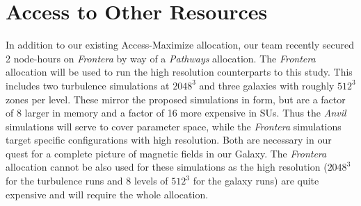 \section{Access to Other Resources}
\label{sec.others}

In addition to our existing Access-Maximize allocation, our team recently
secured 2 node-hours on \emph{Frontera} by way of a \emph{Pathways}
allocation.  The \emph{Frontera} allocation will be used to run the high resolution
counterparts to this study.  This includes two turbulence simulations at $2048^3$ and three
galaxies with roughly $512^3$ zones per level.  These mirror the proposed
simulations in form, but are a factor of 8 larger in memory and a factor of 16 more
expensive in SUs.    Thus the \emph{Anvil} simulations will serve to cover
parameter space, while the \emph{Frontera} simulations target specific
configurations with high resolution.  Both are necessary in our quest for a
complete picture of magnetic fields in our Galaxy.  The \emph{Frontera}
allocation cannot be also used for these simulations as the high resolution
($2048^3$ for the turbulence runs and 8 levels of $512^3$ for the galaxy runs)
are quite expensive and will require the whole allocation.
